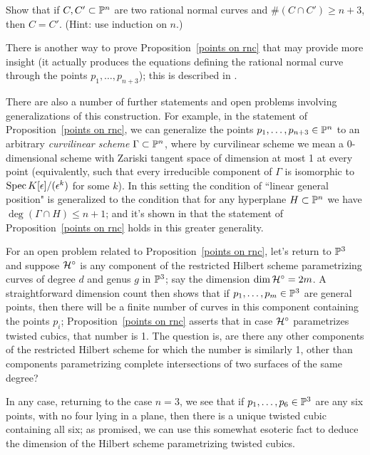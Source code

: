 \begin{exercise}
Show that if $C, C' \subset \PP^n$ are two rational normal curves and $\#(C \cap C') \geq n+3$, then $C = C'$. (Hint: use induction on $n$.)
\end{exercise}

There is another way to prove Proposition~\ref{points on rnc} that may provide more insight (it actually produces the equations defining the rational normal curve through the points $p_1,\dots,p_{n+3}$); this is described in \cite{Montreal}. 

There are also a number of further statements and open problems involving generalizations of this construction. For example, in the statement of Proposition~\ref{points on rnc}, we can generalize the points $p_1,\dots, p_{n+3} \in \PP^n$ to an arbitrary \emph{curvilinear scheme} $\Gamma \subset \PP^n$, where by curvilinear scheme we mean a 0-dimensional scheme with Zariski tangent space of dimension at most 1 at every point (equivalently, such that every irreducible component of $\Gamma$ is isomorphic to $\Spec K[\epsilon]/(\epsilon^k)$ for some $k$). In this setting the condition of ``linear general position" is generalized to the condition that for any hyperplane $H \subset \PP^n$ we have $\deg(\Gamma \cap H) \leq n+1$; and it's shown in \cite{3264} that the statement of Proposition~\ref{points on rnc} holds in this greater generality.

For an open problem related to Proposition~\ref{points on rnc}, let's return to $\PP^3$ and suppose $\cH^\circ$ is  any component of the restricted Hilbert scheme parametrizing curves of degree $d$ and genus $g$ in $\PP^3$; say the dimension $\dim \cH^\circ = 2m$. A straightforward dimension count then shows that if $p_1,\dots,p_m \in \PP^3$ are general points, then there will be a finite number of curves in this component containing the points $p_i$; Proposition~\ref{points on rnc} asserts that in case $\cH^\circ$ parametrizes twisted cubics, that number is 1. The question is, are there any other components of the restricted Hilbert scheme for which the number is similarly 1, other than components parametrizing complete intersections of two surfaces of the same degree?

In any case, returning to the case $n=3$, we see that if $p_1,\dots,p_6 \in \PP^3$ are any six points, with no four lying in a plane, then there is a unique twisted cubic containing all six; as promised, we can use this somewhat esoteric fact to deduce the dimension of the Hilbert scheme parametrizing twisted cubics.

